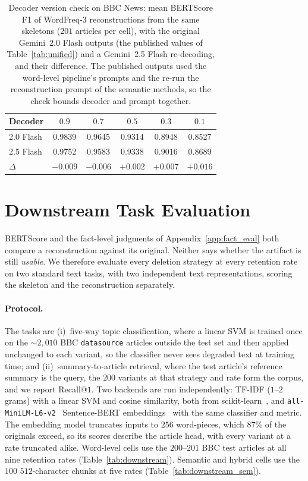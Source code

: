 \documentclass[11pt]{article}
\begin{document}
\begin{table}[htbp]
\centering
\small
\setlength{\tabcolsep}{3pt}
\caption{Decoder version check on BBC News: mean BERTScore F1 of WordFreq-3 reconstructions from the same
skeletons ($201$ articles per cell), with the original Gemini~2.0 Flash outputs (the published values of
Table~\ref{tab:unified}) and a Gemini~2.5 Flash re-decoding, and their difference. The published outputs
used the word-level pipeline's prompts and the re-run the reconstruction prompt of the semantic methods, so
the check bounds decoder and prompt together.}
\label{tab:decoder_check}
\begin{tabular}{lccccc}
\toprule
Decoder & $0.9$ & $0.7$ & $0.5$ & $0.3$ & $0.1$ \\
\midrule
2.0 Flash & 0.9839 & 0.9645 & 0.9314 & 0.8948 & 0.8527 \\
2.5 Flash & 0.9752 & 0.9583 & 0.9338 & 0.9016 & 0.8689 \\
$\Delta$ & $-0.009$ & $-0.006$ & $+0.002$ & $+0.007$ & $+0.016$ \\
\bottomrule
\end{tabular}
\end{table}

\section{Downstream Task Evaluation}
\label{app:downstream}

BERTScore and the fact-level judgments of Appendix~\ref{app:fact_eval} both compare a reconstruction
against its original. Neither says whether the artifact is still \emph{usable}. We therefore evaluate
every deletion strategy at every retention rate on two standard text tasks, with two independent text
representations, scoring the skeleton and the reconstruction separately.

\paragraph{Protocol.}
The tasks are (i)~five-way topic classification, where a linear SVM is trained once on the ${\sim}2{,}010$
BBC \texttt{datasource} articles outside the test set and then applied unchanged to each variant, so the
classifier never sees degraded text at training time; and (ii)~summary-to-article retrieval, where the
test article's reference summary is the query, the $200$ variants at that strategy and rate form the
corpus, and we report Recall@$1$. Two backends are run independently: TF-IDF ($1$--$2$ grams) with a
linear SVM and cosine similarity, both from scikit-learn~\citep{pedregosa2011scikit}, and \texttt{all-MiniLM-L6-v2}~\citep{wang2020minilm} Sentence-BERT embeddings~\citep{reimers2019sentence} with the same classifier and metric. The embedding model truncates inputs to $256$ word-pieces, which $87\%$ of the
originals exceed, so its scores describe the article head, with every variant at a rate truncated alike. Word-level cells use the $200$--$201$ BBC test articles at all nine retention
rates (Table~\ref{tab:downstream}). Semantic and hybrid cells use the $100$ $512$-character chunks at
five rates (Table~\ref{tab:downstream_sem}).
\end{document}
